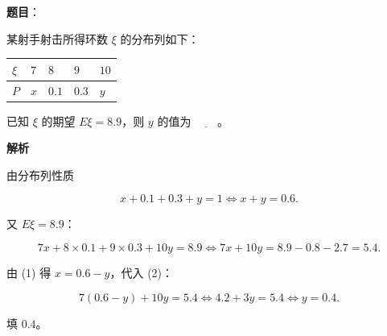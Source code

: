 \begin{answer}

\textbf{题目}：

某射手射击所得环数 $\xi$ 的分布列如下：

\begin{center}
\begin{tabular}{lllll}
\toprule
$\xi$ & $7$ & $8$ & $9$ & $10$ \\
\midrule
$P$ & $x$ & $0.1$ & $0.3$ & $y$ \\
\bottomrule
\end{tabular}
\end{center}

已知 $\xi$ 的期望 $E\xi=8.9$，则 $y$ 的值为 $\underline{\qquad}$。

\textbf{解析}

由分布列性质

\nopagebreak[4]
\[x+0.1+0.3+y=1\iff x+y=0.6. \tag{1}\]

又 $E\xi=8.9$：

\nopagebreak[4]
\[7x+8\times0.1+9\times0.3+10y=8.9
\iff 7x+10y=8.9-0.8-2.7=5.4. \tag{2}\]

由 (1) 得 $x=0.6-y$，代入 (2)：

\nopagebreak[4]
\[7(0.6-y)+10y=5.4\iff 4.2+3y=5.4\iff y=0.4.\]

填 $0.4$。


\end{answer}
